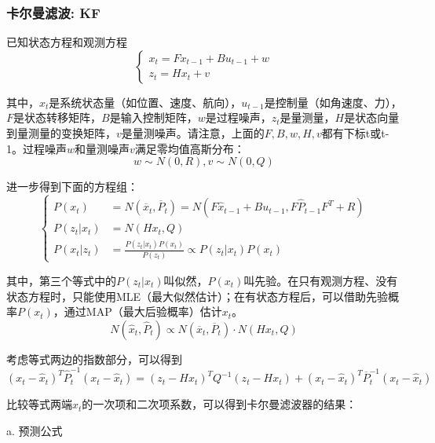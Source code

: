 \documentclass{ctexart}
\begin{document}
{	\subsubsection*{卡尔曼滤波: KF}
	已知状态方程和观测方程
	\begin{equation}
	\left\{
	\begin{array}{lr}
	x_t = F x_{t-1} + B u_{t-1} + w \\
	z_t = H x_t + v
	\end{array}
	\right.
	\end{equation}
	\par 其中，$x_t$是系统状态量（如位置、速度、航向），$u_{t-1}$是控制量（如角速度、力），$F$是状态转移矩阵，$B$是输入控制矩阵，$w$是过程噪声，$z_t$是量测量，$H$是状态向量到量测量的变换矩阵，$v$是量测噪声。请注意，上面的$F,B,w,H,v$都有下标t或t-1。过程噪声$w$和量测噪声$v$满足零均值高斯分布：
	\begin{equation}
	w \sim N(0,R),v \sim N(0,Q)
	\end{equation}
	\par 进一步得到下面的方程组：
	\begin{equation}
	\left\{
	\begin{split}
	P(x_t)
	&=N(\overline{x}_t,\overline{P}_t)
	=N(F \hat{x}_{t-1} + B u_{t-1}, F \hat{P}_{t-1} F^T + R) \\
	P(z_t|x_t) &=N(H x_t,Q) \\
	P(x_t|z_t) &= \frac{P(z_t|x_t) P(x_t)}{P(z_t)} \propto P(z_t|x_t) P(x_t)
	\end{split}
	\right.
	\end{equation}
	\par 其中，第三个等式中的$P(z_t|x_t)$叫似然，$P(x_t)$叫先验。在只有观测方程、没有状态方程时，只能使用MLE（最大似然估计）；在有状态方程后，可以借助先验概率$P(x_t)$，通过MAP（最大后验概率）估计$x_t$。
	\begin{equation}
	N(\hat{x}_t,\hat{P}_t) \propto N(\overline{x}_t,\overline{P}_t) \cdot N(H x_t,Q)
	\end{equation}
	\par 考虑等式两边的指数部分，可以得到
	\begin{equation}
	(x_t-\hat{x}_t)^T\hat{P}_t^{-1}(x_t-\hat{x}_t)
	=
	(z_t-H x_t)^T Q^{-1} (z_t-H x_t)
	+
	(x_t-\hat{x}_t)^T \overline{P}_t^{-1} (x_t-\hat{x}_t)
	\end{equation}
	\par 比较等式两端$x_t$的一次项和二次项系数，可以得到卡尔曼滤波器的结果：
	\par {a. 预测公式}
	\begin{equation}

\end{equation}}
\end{document}
